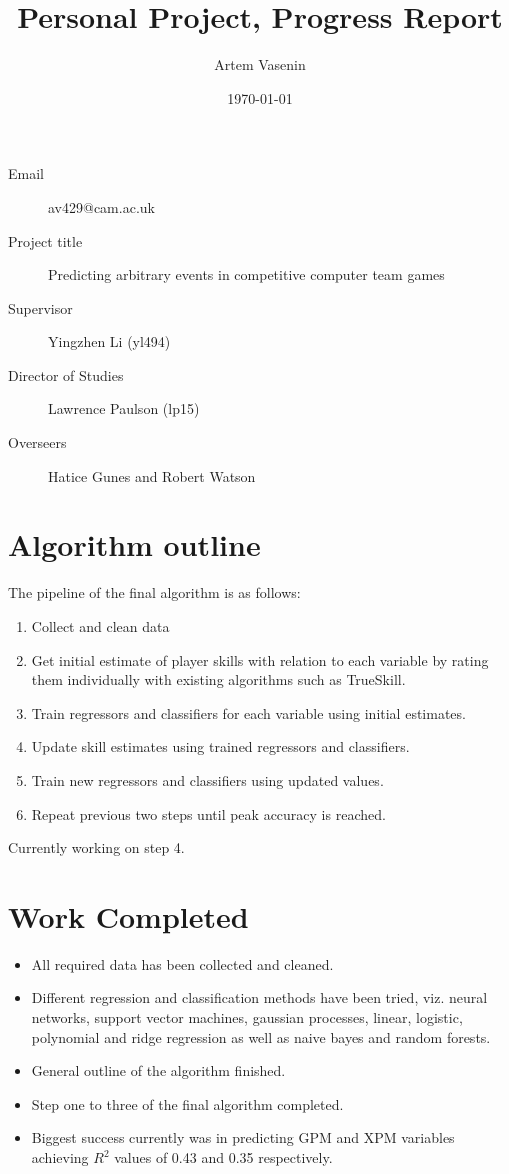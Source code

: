 \documentclass[11pt, a4paper]{article}
\title{Personal Project, Progress Report}
\date{\today}
\author{Artem Vasenin}
\begin{document}
\maketitle


\begin{description}
\item[Email] av429@cam.ac.uk
\item[Project title] Predicting arbitrary events in competitive computer team games
\item[Supervisor] Yingzhen Li (yl494)
\item[Director of Studies] Lawrence Paulson (lp15)
\item[Overseers] Hatice Gunes and Robert Watson
\end{description}

\section*{Algorithm outline}
The pipeline of the final algorithm is as follows:
\begin{enumerate}
\item Collect and clean data
\item Get initial estimate of player skills with relation to each variable by rating them individually with existing algorithms such as TrueSkill.
\item Train regressors and classifiers for each variable using initial estimates.
\item Update skill estimates using trained regressors and classifiers.
\item Train new regressors and classifiers using updated values.
\item Repeat previous two steps until peak accuracy is reached.
\end{enumerate}
Currently working on step 4.

\section*{Work Completed}
\begin{itemize}
\item All required data has been collected and cleaned.
\item Different regression and classification methods have been tried, viz. neural networks, support vector machines, gaussian processes, linear, logistic, polynomial and ridge regression as well as naive bayes and random forests.
\item General outline of the algorithm finished.
\item Step one to three of the final algorithm completed.
\item Biggest success currently was in predicting GPM and XPM variables achieving $R^2$ values of 0.43 and 0.35 respectively.
\end{itemize}
\end{document}
